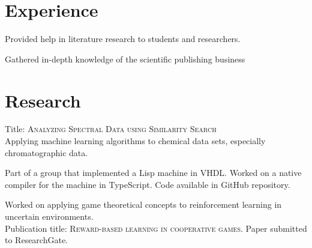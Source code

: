 \documentclass[]{deedy-resume-openfont}
\begin{document}
\begin{minipage}[t]{0.66\textwidth} 


\section{Experience}

\vspace{\topsep} %
\begin{tightemize}
\item Provided help in literature research to students and researchers.
\item Gathered in-depth knowledge of the scientific publishing business 
\end{tightemize}
\sectionsep


\section{Research}
\descript{}
Title: \textsc{Analyzing Spectral Data using Similarity Search} \\
Applying machine learning algorithms to chemical data sets, especially
chromatographic data.  
\sectionsep

Part of a group that implemented a Lisp machine in VHDL. Worked
on a native compiler for the machine in TypeScript. Code available 
in GitHub repository. 

\descript{}
Worked on applying game theoretical concepts to reinforcement learning in uncertain environments. \\
Publication title: \textsc{Reward-based learning in cooperative games}. Paper submitted to ResearchGate. 
\sectionsep


\end{minipage} 
\end{document}
